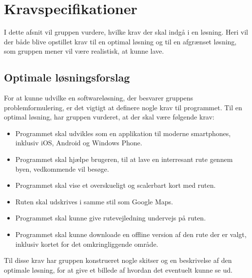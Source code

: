 
\chapter{Kravspecifikationer}
I dette afsnit vil gruppen vurdere, hvilke krav der skal indgå i en løsning. Heri vil der både blive opstillet krav til en optimal løsning og til en afgrænset løsning, som gruppen mener vil være realistisk, at kunne lave.

\section{Optimale løsningsforslag}
For at kunne udvilke en softwareløsning, der besvarer gruppens problemformulering, er det vigtigt at definere nogle krav til programmet. Til en optimal løsning, har gruppen vurderet, at der skal være følgende krav:
\begin{itemize}
	\item Programmet skal udvikles som en applikation til moderne smartphones, inklusiv iOS, Android og Windows Phone.
	\item Programmet skal hjælpe brugeren, til at lave en interresant rute gennem byen, vedkommende vil besøge.
	\item Programmet skal vise et overskueligt og scalerbart kort med ruten.
	\item Ruten skal udskrives i samme stil som Google Maps.
	\item Programmet skal kunne give rutevejledning undervejs på ruten. 
	\item Programmet skal kunne  downloade en offline version af den rute der er valgt, inklusiv kortet for det omkringliggende område.
\end{itemize}
Til disse krav har gruppen konstrueret nogle skitser og en beskrivelse af den optimale løsning, for at give et billede af hvordan det eventuelt kunne se ud. \newpage

